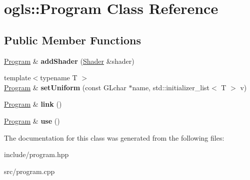 \hypertarget{classogls_1_1Program}{\section{ogls\-:\-:Program Class Reference}
\label{classogls_1_1Program}
}
\subsection*{Public Member Functions}
\begin{DoxyCompactItemize}
\item 
\hypertarget{classogls_1_1Program_a5cddec31b6cb620d64b7024298d20326}{\hyperlink{classogls_1_1Program}{Program} \& {\bfseries add\-Shader} (\hyperlink{classogls_1_1Shader}{Shader} \&shader)}\label{classogls_1_1Program_a5cddec31b6cb620d64b7024298d20326}

\item 
\hypertarget{classogls_1_1Program_ab4baa3dce11c4672e9d3dd97bf94e4b1}{{\footnotesize template$<$typename T $>$ }\\\hyperlink{classogls_1_1Program}{Program} \& {\bfseries set\-Uniform} (const G\-Lchar $\ast$name, std\-::initializer\-\_\-list$<$ T $>$ v)}\label{classogls_1_1Program_ab4baa3dce11c4672e9d3dd97bf94e4b1}

\item 
\hypertarget{classogls_1_1Program_a7d716fc5d669e28aa643affa93e36d67}{\hyperlink{classogls_1_1Program}{Program} \& {\bfseries link} ()}\label{classogls_1_1Program_a7d716fc5d669e28aa643affa93e36d67}

\item 
\hypertarget{classogls_1_1Program_a1438547a0bef924248adb1ebda78656e}{\hyperlink{classogls_1_1Program}{Program} \& {\bfseries use} ()}\label{classogls_1_1Program_a1438547a0bef924248adb1ebda78656e}

\end{DoxyCompactItemize}


The documentation for this class was generated from the following files\-:\begin{DoxyCompactItemize}
\item 
include/program.\-hpp\item 
src/program.\-cpp\end{DoxyCompactItemize}
